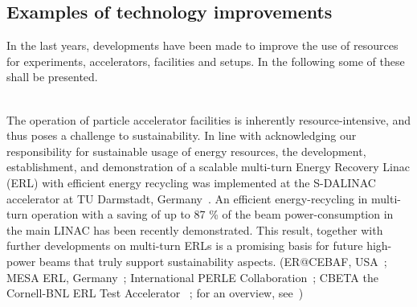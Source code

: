 \documentclass[../SustainableHEP.tex]{subfiles}
\begin{document}

\subsection{Examples of technology improvements}

In the last years, developments have been made to improve the use of resources for experiments, accelerators, facilities and setups. In the following some of these shall be presented.


\begin{bestpractice}\\
The operation of particle accelerator facilities is inherently resource-intensive, and thus poses a challenge to sustainability. In line with acknowledging our responsibility for sustainable usage of energy resources, the development, establishment, and demonstration of a scalable multi-turn Energy Recovery Linac (ERL) with efficient energy recycling was implemented at the S-DALINAC accelerator at TU Darmstadt, Germany~\cite{Arnold:2020snn}. An efficient energy-recycling in multi-turn operation with a saving of up to 87 \% of the beam power-consumption in the main LINAC has been recently demonstrated. This result, together with further developments on multi-turn ERLs is a promising basis for future high-power beams that truly support sustainability aspects. (ER@CEBAF, USA~\cite{Meot:2018yoo}; MESA ERL, Germany~\cite{MESA}; International PERLE Collaboration~\cite{PERLE, PERLECDR}; CBETA the Cornell-BNL ERL Test Accelerator ~\cite{CBETACDR}; for an overview, see~\cite{Klein:2022lgx, Hutton:2022kac}) 
\end{bestpractice}
\end{document}
